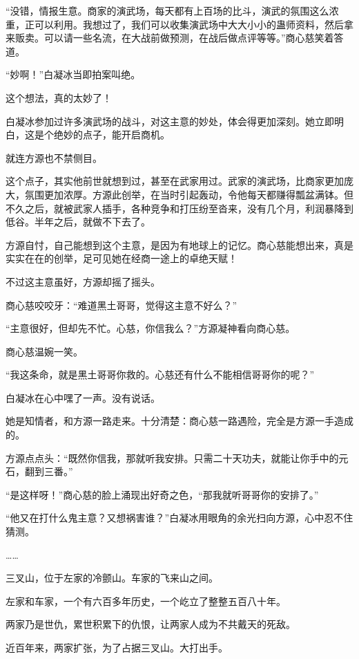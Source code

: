 
\begin{this_body}

“没错，情报生意。商家的演武场，每天都有上百场的比斗，演武的氛围这么浓重，正可以利用。我想过了，我们可以收集演武场中大大小小的蛊师资料，然后拿来贩卖。可以请一些名流，在大战前做预测，在战后做点评等等。”商心慈笑着答道。

“妙啊！”白凝冰当即拍案叫绝。

这个想法，真的太妙了！

白凝冰参加过许多演武场的战斗，对这主意的妙处，体会得更加深刻。她立即明白，这是个绝妙的点子，能开启商机。

就连方源也不禁侧目。

这个点子，其实他前世就想到过，甚至在武家用过。武家的演武场，比商家更加庞大，氛围更加浓厚。方源此创举，在当时引起轰动，令他每天都赚得瓢盆满钵。但不久之后，就被武家人插手，各种竞争和打压纷至沓来，没有几个月，利润暴降到低谷。半年之后，就做不下去了。

方源自忖，自己能想到这个主意，是因为有地球上的记忆。商心慈能想出来，真是实实在在的创举，足可见她在经商一途上的卓绝天赋！

不过这主意虽好，方源却摇了摇头。

商心慈咬咬牙：“难道黑土哥哥，觉得这主意不好么？”

“主意很好，但却先不忙。心慈，你信我么？”方源凝神看向商心慈。

商心慈温婉一笑。

“我这条命，就是黑土哥哥你救的。心慈还有什么不能相信哥哥你的呢？”

白凝冰在心中嘿了一声。没有说话。

她是知情者，和方源一路走来。十分清楚：商心慈一路遇险，完全是方源一手造成的。

方源点点头：“既然你信我，那就听我安排。只需二十天功夫，就能让你手中的元石，翻到三番。”

“是这样呀！”商心慈的脸上涌现出好奇之色，“那我就听哥哥你的安排了。”

“他又在打什么鬼主意？又想祸害谁？”白凝冰用眼角的余光扫向方源，心中忍不住猜测。

……

三叉山，位于左家的冷颤山。车家的飞来山之间。

左家和车家，一个有六百多年历史，一个屹立了整整五百八十年。

两家乃是世仇，累世积累下的仇恨，让两家人成为不共戴天的死敌。

近百年来，两家扩张，为了占据三叉山。大打出手。


\end{this_body}
